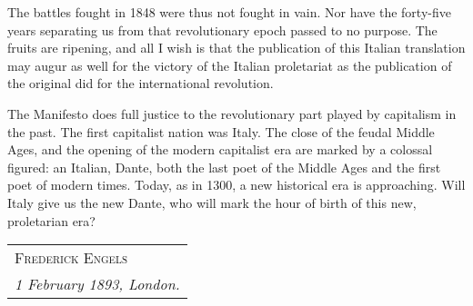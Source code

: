 The battles fought in 1848 were thus not fought in vain. Nor have the forty-five years separating us from that revolutionary epoch passed to no purpose. The fruits are ripening, and all I wish is that the publication of this Italian translation may augur as well for the victory of the Italian proletariat as the publication of the original did for the international revolution.

The Manifesto does full justice to the revolutionary part played by capitalism in the past. The first capitalist nation was Italy. The close of the feudal Middle Ages, and the opening of the modern capitalist era are marked by a colossal figured: an Italian, Dante, both the last poet of the Middle Ages and the first poet \clearpage of modern times. Today, as in 1300, a new historical era is approaching. Will Italy give us the new Dante, who will mark the hour of birth of this new, proletarian era?

\hfill
\begin{tabular}{@{}l@{}}
\scshape Frederick Engels \\
\emph{1 February 1893, London.}
\end{tabular}
